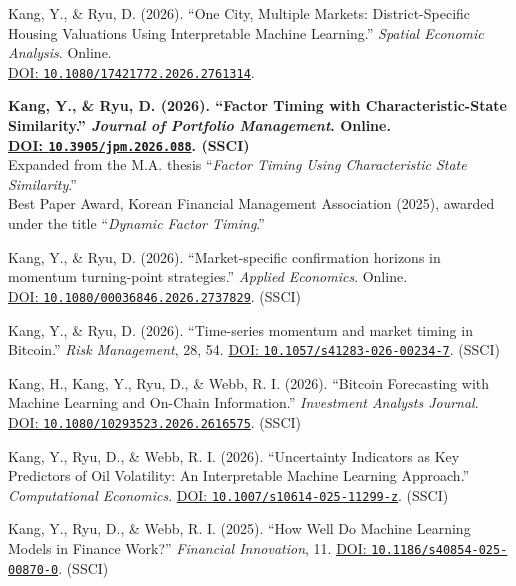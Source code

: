 \documentclass[11pt,a4paper]{article}
\begin{document}
\begin{description}[leftmargin=2.2em]
\item[\normalfont{[8]}] Kang, Y., \& Ryu, D. (2026). ``One City, Multiple Markets: District-Specific Housing Valuations Using Interpretable Machine Learning.'' \textit{Spatial Economic Analysis}. Online.\\[-1pt]
\href{https://doi.org/10.1080/17421772.2026.2761314}{DOI: \nolinkurl{10.1080/17421772.2026.2761314}}.
\item[\normalfont{[7]}] \textbf{Kang, Y., \& Ryu, D. (2026). ``Factor Timing with Characteristic-State Similarity.'' \textit{Journal of Portfolio Management}. Online.\\[-1pt]
\textnormal{\href{https://doi.org/10.3905/jpm.2026.088}{DOI: \nolinkurl{10.3905/jpm.2026.088}}}. (SSCI)}\\[-1pt]
{\normalfont\small Expanded from the M.A. thesis ``\textit{Factor Timing Using Characteristic State Similarity}.''\\
Best Paper Award, Korean Financial Management Association (2025), awarded under the title ``\textit{Dynamic Factor Timing}.''}
\item[\normalfont{[6]}] Kang, Y., \& Ryu, D. (2026). ``Market-specific confirmation horizons in momentum turning-point strategies.'' \textit{Applied Economics}. Online.\\[-1pt]
\href{https://doi.org/10.1080/00036846.2026.2737829}{DOI: \nolinkurl{10.1080/00036846.2026.2737829}}. (SSCI)
\item[\normalfont{[5]}] Kang, Y., \& Ryu, D. (2026). ``Time-series momentum and market timing in Bitcoin.'' \textit{Risk Management}, 28, 54. \href{https://doi.org/10.1057/s41283-026-00234-7}{DOI: \nolinkurl{10.1057/s41283-026-00234-7}}. (SSCI)
\item[\normalfont{[4]}] Kang, H., Kang, Y., Ryu, D., \& Webb, R. I. (2026). ``Bitcoin Forecasting with Machine Learning and On-Chain Information.'' \textit{Investment Analysts Journal}.\\[-1pt]
\href{https://doi.org/10.1080/10293523.2026.2616575}{DOI: \nolinkurl{10.1080/10293523.2026.2616575}}. (SSCI)
\item[\normalfont{[3]}] Kang, Y., Ryu, D., \& Webb, R. I. (2026). ``Uncertainty Indicators as Key Predictors of Oil Volatility: An Interpretable Machine Learning Approach.'' \textit{Computational Economics}. \href{https://doi.org/10.1007/s10614-025-11299-z}{DOI: \nolinkurl{10.1007/s10614-025-11299-z}}. (SSCI)
\item[\normalfont{[2]}] Kang, Y., Ryu, D., \& Webb, R. I. (2025). ``How Well Do Machine Learning Models in Finance Work?'' \textit{Financial Innovation}, 11. \href{https://doi.org/10.1186/s40854-025-00870-0}{DOI: \nolinkurl{10.1186/s40854-025-00870-0}}. (SSCI)\\[-1pt]

\end{description}
\end{document}
